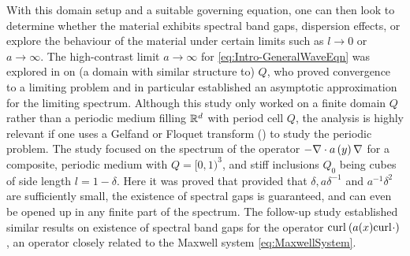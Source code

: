With this domain setup and a suitable governing equation, one can then look to determine whether the material exhibits spectral band gaps, dispersion effects, or explore the behaviour of the material under certain limits such as $l\rightarrow0$ or $a\rightarrow\infty$.
The high-contrast limit $a\rightarrow\infty$ for \eqref{eq:Intro-GeneralWaveEqn} was explored in  on (a domain with similar structure to) $Q$, who proved convergence to a limiting problem and in particular established an asymptotic approximation for the limiting spectrum.
Although this study only worked on a finite domain $Q$ rather than a periodic medium filling $\mathbb{R}^d$ with period cell $Q$, the analysis is highly relevant if one uses a Gelfand or Floquet transform () to study the periodic problem.
The study  focused on the spectrum of the operator $-\nabla\cdot a\left( y \right)\nabla$ for a composite, periodic medium with $Q=[0,1)^3$, and stiff inclusions $Q_0$ being cubes of side length $l = 1-\delta$.
Here it was proved that provided that $\delta, a\delta^{-1}$ and $a^{-1}\delta^2$ are sufficiently small, the existence of spectral gaps is guaranteed, and can even be opened up in any finite part of the spectrum.
The follow-up study  established similar results on existence of spectral band gaps for the operator $\mathrm{curl}_{}\left( a(x)\mathrm{curl}_{}\cdot \right)$, an operator closely related to the Maxwell system \eqref{eq:MaxwellSystem}.

